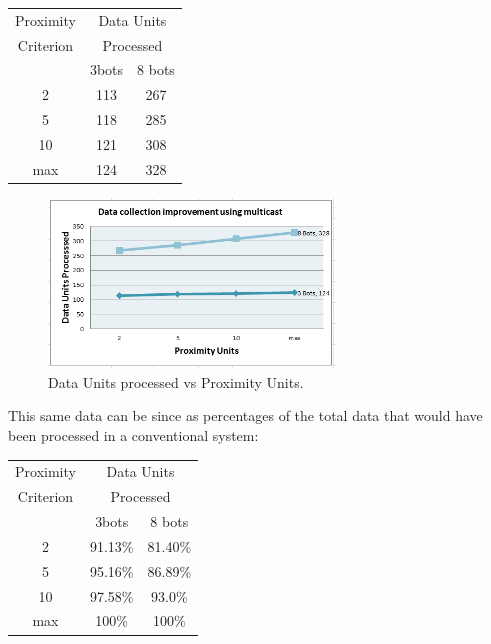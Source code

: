 \documentclass[journal]{IEEEtran}
\begin{document}
\begin{center}
    \begin{tabular}{ | c | c | c |}
    \hline
    Proximity & \multicolumn{2}{|c|}{Data Units}  \\
    Criterion & \multicolumn{2}{|c|}{Processed}   \\  \cline{2-3} 
     & 3bots & 8 bots       \\ \hline \hline
    2 & 113 & 267	    \\
    5 & 118 & 285	    \\
    10 & 121 & 308	    \\
    max & 124 & 328	    \\
    \hline
    \end{tabular}
\end{center}

\begin{figure}[h!]
	\begin{center}
	\includegraphics[width=3in]{graph.png}
	\caption{Data Units processed vs Proximity Units.}
	\end{center}
\end{figure}

This same data can be since as percentages of the total data that would have been processed in a conventional system:

\begin{center}
    \begin{tabular}{ | c | c | c |}
    \hline
    Proximity & \multicolumn{2}{|c|}{Data Units} \\
    Criterion & \multicolumn{2}{|c|}{Processed} \\   \cline{2-3} 
     & 3bots & 8 bots        \\ \hline \hline
    2 & 91.13\% & 81.40\%    \\
    5 & 95.16\% & 86.89\%    \\
    10 & 97.58\% & 93.0\%    \\
    max & 100\% & 100\%	     \\
    \hline
    \end{tabular}
\end{center}
\end{document}
